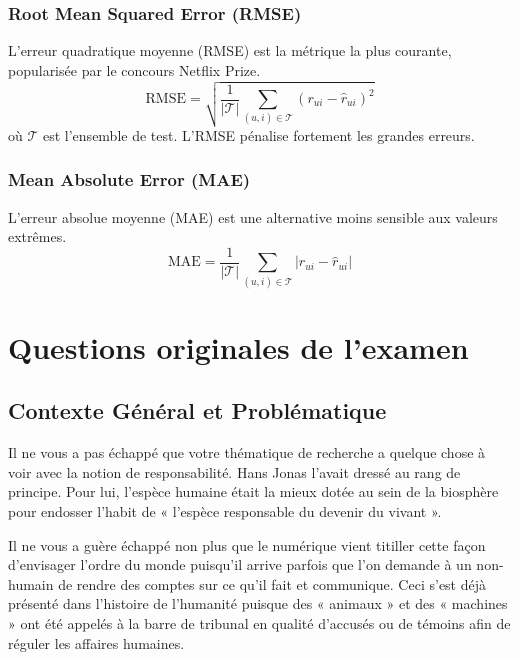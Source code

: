 \subsection{Root Mean Squared Error (RMSE)}
L'erreur quadratique moyenne (RMSE) est la métrique la plus courante, popularisée par le concours Netflix Prize.
\begin{equation}
\label{eq:rmse_annexe}
\text{RMSE} = \sqrt{\frac{1}{|\mathcal{T}|} \sum_{(u,i) \in \mathcal{T}} (r_{ui} - \hat{r}_{ui})^2}
\end{equation}
où $\mathcal{T}$ est l'ensemble de test. L'RMSE pénalise fortement les grandes erreurs.

\subsection{Mean Absolute Error (MAE)}
L'erreur absolue moyenne (MAE) est une alternative moins sensible aux valeurs extrêmes.
\begin{equation}
\label{eq:mae_annexe}
\text{MAE} = \frac{1}{|\mathcal{T}|} \sum_{(u,i) \in \mathcal{T}} |r_{ui} - \hat{r}_{ui}|
\end{equation}

\chapter{Questions originales de l'examen}
\label{annexe:questions_originales}

\section{Contexte Général et Problématique}

Il ne vous a pas échappé que votre thématique de recherche a quelque chose à voir avec la notion de responsabilité. Hans Jonas l’avait dressé au rang de principe. Pour lui, l’espèce humaine était la mieux dotée au sein de la biosphère pour endosser l’habit de « l’espèce responsable du devenir du vivant ».

Il ne vous a guère échappé non plus que le numérique vient titiller cette façon d’envisager l’ordre du monde puisqu’il arrive parfois que l’on demande à un non-humain de rendre des comptes sur ce qu’il fait et communique. Ceci s’est déjà présenté dans l’histoire de l’humanité puisque des « animaux » et des « machines » ont été appelés à la barre de tribunal en qualité d’accusés ou de témoins afin de réguler les affaires humaines.


